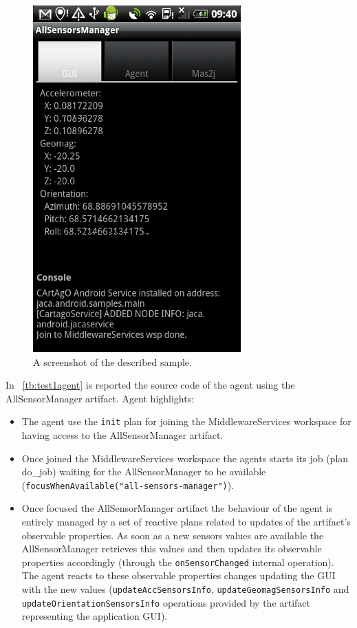 \documentclass[11pt]{report}
\newcommand\xt[1]{\tablename~\ref{tb:#1}}
\newcommand\code[1]{{\mbox{\texttt{{#1}}}}}
\begin{document}
\begin{figure}[!h]
\begin{center}
\includegraphics[width=8cm]{images/test_sensors_gui.png}
\end{center}
\caption{A screenshot of the described sample.}
\end{figure}

In \xt{test1agent} is reported the source code of the agent using the \mbox{\textsf{AllSensorManager}} artifact. 
%
Agent highlights: 

\begin{itemize}
%
\item The agent use the \code{init} plan for joining the \textsf{MiddlewareServices} workspace for having access to the \textsf{AllSensorManager} artifact.
%
\item Once joined the \textsf{MiddlewareServices} workspace the agents starts its job (plan \textsf{do\_job}) waiting for the \textsf{AllSensorManager} to be available (\code{focusWhenAvailable("all-sensors-manager")}).
%
\item Once focused the \textsf{AllSensorManager} artifact the behaviour of the agent is entirely managed by a set of reactive plans related to updates of the artifact's observable properties. As soon as a new sensors values are available the \textsf{AllSensorManager} retrieves this values and then updates its observable properties accordingly (through the \code{onSensorChanged} internal operation). The agent reacts to these observable properties changes updating the GUI with the new values (\code{updateAccSensorsInfo}, \code{updateGeomagSensorsInfo} and \code{updateOrientationSensorsInfo} operations provided by the artifact representing the application GUI).
%
\end{itemize}
\end{document}
